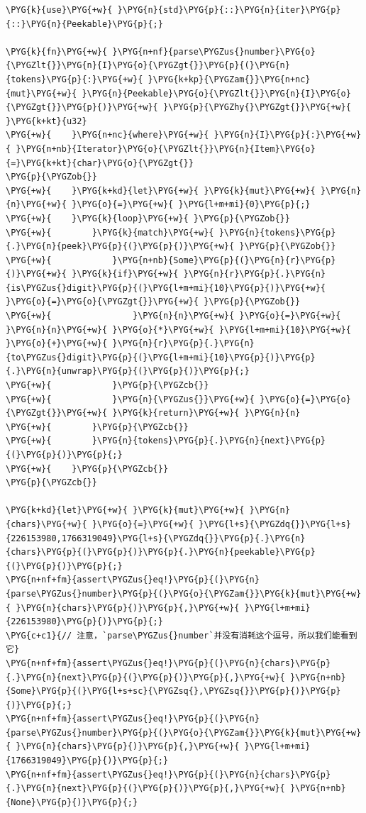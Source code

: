 \begin{Verbatim}[commandchars=\\\{\},breaklines=true,breakanywhere=true,fontsize=\codefont,xleftmargin=17bp]
\PYG{k}{use}\PYG{+w}{ }\PYG{n}{std}\PYG{p}{::}\PYG{n}{iter}\PYG{p}{::}\PYG{n}{Peekable}\PYG{p}{;}

\PYG{k}{fn}\PYG{+w}{ }\PYG{n+nf}{parse\PYGZus{}number}\PYG{o}{\PYGZlt{}}\PYG{n}{I}\PYG{o}{\PYGZgt{}}\PYG{p}{(}\PYG{n}{tokens}\PYG{p}{:}\PYG{+w}{ }\PYG{k+kp}{\PYGZam{}}\PYG{n+nc}{mut}\PYG{+w}{ }\PYG{n}{Peekable}\PYG{o}{\PYGZlt{}}\PYG{n}{I}\PYG{o}{\PYGZgt{}}\PYG{p}{)}\PYG{+w}{ }\PYG{p}{\PYGZhy{}\PYGZgt{}}\PYG{+w}{ }\PYG{k+kt}{u32}
\PYG{+w}{    }\PYG{n+nc}{where}\PYG{+w}{ }\PYG{n}{I}\PYG{p}{:}\PYG{+w}{ }\PYG{n+nb}{Iterator}\PYG{o}{\PYGZlt{}}\PYG{n}{Item}\PYG{o}{=}\PYG{k+kt}{char}\PYG{o}{\PYGZgt{}}
\PYG{p}{\PYGZob{}}
\PYG{+w}{    }\PYG{k+kd}{let}\PYG{+w}{ }\PYG{k}{mut}\PYG{+w}{ }\PYG{n}{n}\PYG{+w}{ }\PYG{o}{=}\PYG{+w}{ }\PYG{l+m+mi}{0}\PYG{p}{;}
\PYG{+w}{    }\PYG{k}{loop}\PYG{+w}{ }\PYG{p}{\PYGZob{}}
\PYG{+w}{        }\PYG{k}{match}\PYG{+w}{ }\PYG{n}{tokens}\PYG{p}{.}\PYG{n}{peek}\PYG{p}{(}\PYG{p}{)}\PYG{+w}{ }\PYG{p}{\PYGZob{}}
\PYG{+w}{            }\PYG{n+nb}{Some}\PYG{p}{(}\PYG{n}{r}\PYG{p}{)}\PYG{+w}{ }\PYG{k}{if}\PYG{+w}{ }\PYG{n}{r}\PYG{p}{.}\PYG{n}{is\PYGZus{}digit}\PYG{p}{(}\PYG{l+m+mi}{10}\PYG{p}{)}\PYG{+w}{ }\PYG{o}{=}\PYG{o}{\PYGZgt{}}\PYG{+w}{ }\PYG{p}{\PYGZob{}}
\PYG{+w}{                }\PYG{n}{n}\PYG{+w}{ }\PYG{o}{=}\PYG{+w}{ }\PYG{n}{n}\PYG{+w}{ }\PYG{o}{*}\PYG{+w}{ }\PYG{l+m+mi}{10}\PYG{+w}{ }\PYG{o}{+}\PYG{+w}{ }\PYG{n}{r}\PYG{p}{.}\PYG{n}{to\PYGZus{}digit}\PYG{p}{(}\PYG{l+m+mi}{10}\PYG{p}{)}\PYG{p}{.}\PYG{n}{unwrap}\PYG{p}{(}\PYG{p}{)}\PYG{p}{;}
\PYG{+w}{            }\PYG{p}{\PYGZcb{}}
\PYG{+w}{            }\PYG{n}{\PYGZus{}}\PYG{+w}{ }\PYG{o}{=}\PYG{o}{\PYGZgt{}}\PYG{+w}{ }\PYG{k}{return}\PYG{+w}{ }\PYG{n}{n}
\PYG{+w}{        }\PYG{p}{\PYGZcb{}}
\PYG{+w}{        }\PYG{n}{tokens}\PYG{p}{.}\PYG{n}{next}\PYG{p}{(}\PYG{p}{)}\PYG{p}{;}
\PYG{+w}{    }\PYG{p}{\PYGZcb{}}
\PYG{p}{\PYGZcb{}}

\PYG{k+kd}{let}\PYG{+w}{ }\PYG{k}{mut}\PYG{+w}{ }\PYG{n}{chars}\PYG{+w}{ }\PYG{o}{=}\PYG{+w}{ }\PYG{l+s}{\PYGZdq{}}\PYG{l+s}{226153980,1766319049}\PYG{l+s}{\PYGZdq{}}\PYG{p}{.}\PYG{n}{chars}\PYG{p}{(}\PYG{p}{)}\PYG{p}{.}\PYG{n}{peekable}\PYG{p}{(}\PYG{p}{)}\PYG{p}{;}
\PYG{n+nf+fm}{assert\PYGZus{}eq!}\PYG{p}{(}\PYG{n}{parse\PYGZus{}number}\PYG{p}{(}\PYG{o}{\PYGZam{}}\PYG{k}{mut}\PYG{+w}{ }\PYG{n}{chars}\PYG{p}{)}\PYG{p}{,}\PYG{+w}{ }\PYG{l+m+mi}{226153980}\PYG{p}{)}\PYG{p}{;}
\PYG{c+c1}{// 注意，`parse\PYGZus{}number`并没有消耗这个逗号，所以我们能看到它}
\PYG{n+nf+fm}{assert\PYGZus{}eq!}\PYG{p}{(}\PYG{n}{chars}\PYG{p}{.}\PYG{n}{next}\PYG{p}{(}\PYG{p}{)}\PYG{p}{,}\PYG{+w}{ }\PYG{n+nb}{Some}\PYG{p}{(}\PYG{l+s+sc}{\PYGZsq{},\PYGZsq{}}\PYG{p}{)}\PYG{p}{)}\PYG{p}{;}
\PYG{n+nf+fm}{assert\PYGZus{}eq!}\PYG{p}{(}\PYG{n}{parse\PYGZus{}number}\PYG{p}{(}\PYG{o}{\PYGZam{}}\PYG{k}{mut}\PYG{+w}{ }\PYG{n}{chars}\PYG{p}{)}\PYG{p}{,}\PYG{+w}{ }\PYG{l+m+mi}{1766319049}\PYG{p}{)}\PYG{p}{;}
\PYG{n+nf+fm}{assert\PYGZus{}eq!}\PYG{p}{(}\PYG{n}{chars}\PYG{p}{.}\PYG{n}{next}\PYG{p}{(}\PYG{p}{)}\PYG{p}{,}\PYG{+w}{ }\PYG{n+nb}{None}\PYG{p}{)}\PYG{p}{;}
\end{Verbatim}

